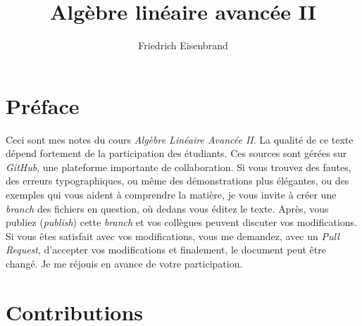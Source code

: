 \documentclass[a4paper,11pt,french]{scrbook}
\title{Algèbre linéaire avancée II}
\author{Friedrich Eisenbrand}
\theoremstyle{plain}
\theoremstyle{definition}
\begin{document}
\maketitle
  
\section*{Préface}
\noindent Ceci sont mes notes du cours \emph{Algèbre Linéaire Avancée II}.
La qualité de ce texte dépend fortement de la participation  des étudiants. 
Ces  sources sont gérées sur \emph{GitHub}, une plateforme importante de collaboration. Si vous trouvez des fautes, des erreurs typographiques, ou même des démonstrations plus élégantes, ou des exemples qui vous aident à comprendre la matière, je vous invite à créer une \emph{branch} des fichiers en question, où dedans vous éditez le texte. Après, vous publiez (\emph{publish}) cette \emph{branch} et vos collègues peuvent discuter vos modifications. Si vous êtes satisfait avec vos modifications, vous me demandez, avec un \emph{Pull Request}, d'accepter vos modifications et finalement, le document peut être changé. Je me réjouis en avance de votre participation. 

  
\section*{Contributions}
\end{document}
